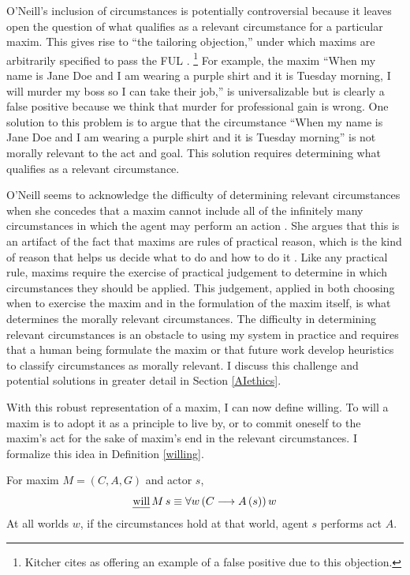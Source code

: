 \begin{isabellebody}
\begin{isamarkuptext}
O'Neill's inclusion of circumstances is potentially controversial because it leaves open the question of what qualifies as a 
relevant circumstance for a particular maxim. This gives rise to ``the tailoring objection,'' 
under which maxims are arbitrarily specified to pass the FUL  \citep[217]{whatisamaxim}. \footnote{Kitcher
cites \citet{kantsethicalthought} as offering an example of a false positive due to this objection.} For example, the maxim ``When my name is Jane Doe
and I am wearing a purple shirt and it is Tuesday morning, I will murder my boss so I can take their job,'' 
is universalizable but is clearly a false positive because we think that murder for professional gain is wrong. 
One solution to this problem is to argue that the circumstance ``When my name is Jane Doe and I am wearing a 
purple shirt and it is Tuesday morning'' is not morally relevant 
to the act and goal. This solution requires determining what qualifies as a relevant circumstance.

O'Neill seems to acknowledge the difficulty of determining relevant circumstances when she concedes that a maxim cannot include all 
of the infinitely many circumstances in which the agent may perform an action \citep[4:428]{actingonprinciple}. She argues that this is 
an artifact of the fact that maxims are rules of practical reason, which is the kind of reason that helps us decide what to do 
and how to do it \citep{bok}. Like any practical rule, 
maxims require the exercise of practical judgement to determine in which circumstances they should be applied. 
This judgement, applied in both choosing when to exercise the maxim and in the formulation of the maxim 
itself, is what determines the morally relevant circumstances.  
The difficulty in determining relevant circumstances is an obstacle to using my system in practice and requires that a 
human being formulate the maxim or that future work develop heuristics to classify circumstances as morally 
relevant. I discuss this challenge and potential solutions in greater detail in Section \ref{AIethics}.

With this robust representation of a maxim, I can now define willing. To will a maxim is to adopt it 
as a principle to live by, or to commit oneself to the maxim's act for the 
sake of maxim's end in the relevant circumstances. I formalize this idea in Definition \ref{willing}.

\begin{definition}[Willing]\label{willing}
For maxim $M = (C, A, G)$ and actor $s$,
$$\text{\emph{will}} \, M \, s \equiv \forall w \, (C \longrightarrow A \, (s)) \, w$$
\noindent At all worlds $w$, if the circumstances hold at that world, agent $s$ performs act $A$.
\end{definition}


\end{isamarkuptext}
\end{isabellebody}
